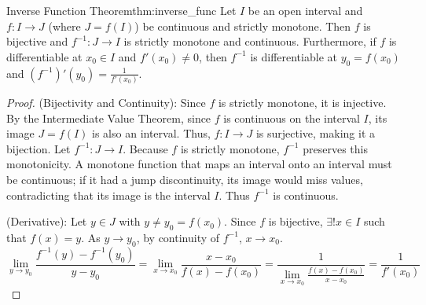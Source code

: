 \documentclass[11pt, a4paper]{article}
\begin{document}
\begin{theorem}{Inverse Function Theorem}{thm:inverse_func}
Let $I$ be an open interval and $f: I \to J$ (where $J = f(I)$) be continuous and strictly monotone. Then $f$ is bijective and $f^{-1}: J \to I$ is strictly monotone and continuous. 
Furthermore, if $f$ is differentiable at $x_0 \in I$ and $f'(x_0) \neq 0$, then $f^{-1}$ is differentiable at $y_0 = f(x_0)$ and $(f^{-1})'(y_0) = \frac{1}{f'(x_0)}$.
\end{theorem}
\begin{proof}
(Bijectivity and Continuity): Since $f$ is strictly monotone, it is injective. By the Intermediate Value Theorem, since $f$ is continuous on the interval $I$, its image $J = f(I)$ is also an interval. Thus, $f: I \to J$ is surjective, making it a bijection.
Let $f^{-1}: J \to I$. Because $f$ is strictly monotone, $f^{-1}$ preserves this monotonicity. A monotone function that maps an interval onto an interval must be continuous; if it had a jump discontinuity, its image would miss values, contradicting that its image is the interval $I$. Thus $f^{-1}$ is continuous.

(Derivative): Let $y \in J$ with $y \neq y_0 = f(x_0)$. Since $f$ is bijective, $\exists! x \in I$ such that $f(x) = y$. As $y \to y_0$, by continuity of $f^{-1}$, $x \to x_0$.
$$ \lim_{y \to y_0} \frac{f^{-1}(y) - f^{-1}(y_0)}{y - y_0} = \lim_{x \to x_0} \frac{x - x_0}{f(x) - f(x_0)} = \frac{1}{\lim_{x \to x_0} \frac{f(x) - f(x_0)}{x - x_0}} = \frac{1}{f'(x_0)} $$
\end{proof}
\end{document}
